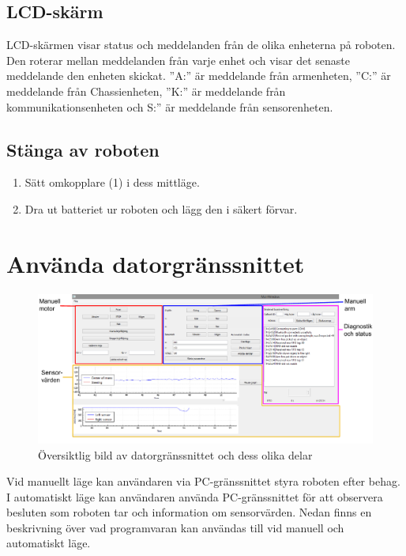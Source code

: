 \documentclass[a4paper,12pt]{article}
\begin{document}
\subsection{LCD-skärm}
LCD-skärmen visar status och meddelanden från de olika enheterna på roboten. Den roterar mellan meddelanden från varje enhet och visar det senaste meddelande den enheten skickat. ''A:'' är meddelande från armenheten, ''C:'' är meddelande från Chassienheten, ''K:'' är meddelande från kommunikationsenheten och S:'' är meddelande från sensorenheten. 

\subsection{Stänga av roboten}
\begin{enumerate}
\item Sätt omkopplare (1) i dess mittläge.
\item Dra ut batteriet ur roboten och lägg den i säkert förvar.
\end{enumerate}
%
%
\section{Använda datorgränssnittet}

\begin{figure}[H]
	\centering
	\includegraphics[width=1.0\textwidth]{PC_manual.pdf}
	\caption{Översiktlig bild av datorgränssnittet och dess olika delar}
	\label{fig:pc_oversikt}
\end{figure}

Vid manuellt läge kan användaren via PC-gränssnittet styra roboten efter behag. I automatiskt läge kan användaren använda PC-gränssnittet för att observera besluten som roboten tar och information om sensorvärden. Nedan finns en beskrivning över vad programvaran kan användas till vid manuell och automatiskt läge. 
\end{document}
